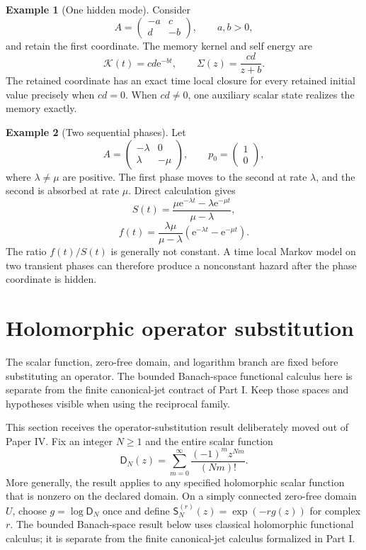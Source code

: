 \documentclass[11pt,letterpaper]{article}
\theoremstyle{plain}
\theoremstyle{plain}
\theoremstyle{plain}
\theoremstyle{definition}
\theoremstyle{definition}
\theoremstyle{definition}
\newtheorem{example}[example]{Example}
\theoremstyle{definition}
\theoremstyle{definition}
\theoremstyle{remark}
\theoremstyle{remark}
\theoremstyle{remark}
\theoremstyle{remark}
\theoremstyle{remark}
\theoremstyle{remark}
\newcommand{\Dfun}{\mathsf D}
\newcommand{\Sfun}{\mathsf S}
\newcommand{\Kcal}{\mathcal K}
\newcommand{\e}{\mathrm e}
\let\KomorebiPrimitiveMathcal\mathcal
\renewcommand{\mathcal}[1]{{\KomorebiPrimitiveMathcal{#1}}}
\let\KomorebiPrimitivemathsf\mathsf
\renewcommand{\mathsf}[1]{{\KomorebiPrimitivemathsf{#1}}}
\let\KomorebiPrimitivemathrm\mathrm
\renewcommand{\mathrm}[1]{{\KomorebiPrimitivemathrm{#1}}}
\begin{document}
\begin{example}[One hidden mode]\label{earlier:record:029}\label{earlier:ex:one_hidden_mode}
Consider
\[
A=
\begin{pmatrix}
-a&c\\
d&-b
\end{pmatrix},
\qquad
a,b>0,
\]
and retain the first coordinate. The memory kernel and self energy are
\[
\Kcal(t)=cd\e^{-bt},
\qquad
\Sigma(z)=\frac{cd}{z+b}.
\]
The retained coordinate has an exact time local closure for every retained initial value precisely when \(cd=0\). When \(cd\neq0\), one auxiliary scalar state realizes the memory exactly.
\end{example}

\begin{example}[Two sequential phases]\label{earlier:record:030}\label{earlier:ex:two_phase_survival}
Let
\[
A=
\begin{pmatrix}
-\lambda&0\\
\lambda&-\mu
\end{pmatrix},
\qquad
p_0=
\begin{pmatrix}1\\0\end{pmatrix},
\]
where \(\lambda\neq\mu\) are positive. The first phase moves to the second at rate \(\lambda\), and the second is absorbed at rate \(\mu\). Direct calculation gives
\[
S(t)=
\frac{\mu\e^{-\lambda t}-\lambda\e^{-\mu t}}{\mu-\lambda},
\]
\[
f(t)=
\frac{\lambda\mu}{\mu-\lambda}
\left(\e^{-\lambda t}-\e^{-\mu t}\right).
\]
The ratio \(f(t)/S(t)\) is generally not constant. A time local Markov model on two transient phases can therefore produce a nonconstant hazard after the phase coordinate is hidden.
\end{example}

\FloatBarrier
\section{Holomorphic operator substitution}\label{migration:section:01}\label{migration:sec:operator_substitution}
\begin{readerroadmap}
The scalar function, zero-free domain, and logarithm branch are fixed before substituting an operator. The bounded Banach-space functional calculus here is separate from the finite canonical-jet contract of Part I. Keep those spaces and hypotheses visible when using the reciprocal family.
\end{readerroadmap}


This section receives the operator-substitution result deliberately moved out of Paper IV. Fix an integer $N\geq1$ and the entire scalar function
\[
\Dfun_N(z)=\sum_{m=0}^{\infty}\frac{(-1)^m z^{Nm}}{(Nm)!}.
\]
More generally, the result applies to any specified holomorphic scalar function that is nonzero on the declared domain. On a simply connected zero-free domain $U$, choose $g=\log\Dfun_N$ once and define $\Sfun_N^{(r)}(z)=\exp(-r g(z))$ for complex $r$. The bounded Banach-space result below uses classical holomorphic functional calculus; it is separate from the finite canonical-jet calculus formalized in Part I.
\end{document}
